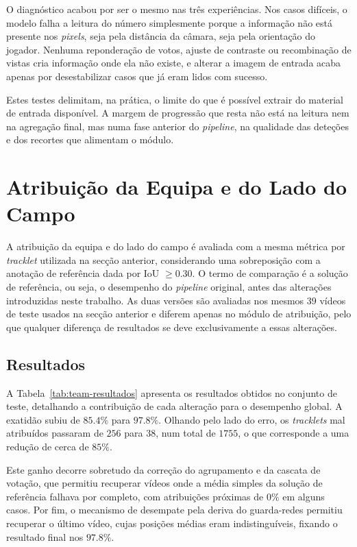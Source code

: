 O diagnóstico acabou por ser o mesmo nas três experiências. Nos casos difíceis, o modelo falha a leitura do número simplesmente porque a informação não está presente nos \emph{pixels}, seja pela distância da câmara, seja pela orientação do jogador. Nenhuma reponderação de votos, ajuste de contraste ou recombinação de vistas cria informação onde ela não existe, e alterar a imagem de entrada acaba apenas por desestabilizar casos que já eram lidos com sucesso.

Estes testes delimitam, na prática, o limite do que é possível extrair do material de entrada disponível. A margem de progressão que resta não está na leitura nem na agregação final, mas numa fase anterior do \emph{pipeline}, na qualidade das deteções e dos recortes que alimentam o módulo.

\section{Atribuição da Equipa e do Lado do Campo}

A atribuição da equipa e do lado do campo é avaliada com a mesma métrica por \emph{tracklet} utilizada na secção anterior, considerando uma sobreposição com a anotação de referência dada por IoU $\geq 0.30$. O termo de comparação é a solução de referência, ou seja, o desempenho do \emph{pipeline} original, antes das alterações introduzidas neste trabalho. As duas versões são avaliadas nos mesmos $39$ vídeos de teste usados na secção anterior e diferem apenas no módulo de atribuição, pelo que qualquer diferença de resultados se deve exclusivamente a essas alterações.

\subsection{Resultados}

A Tabela~\ref{tab:team-resultados} apresenta os resultados obtidos no conjunto de teste, detalhando a contribuição de cada alteração para o desempenho global. A exatidão subiu de $85.4\%$ para $97.8\%$. Olhando pelo lado do erro, os \emph{tracklets} mal atribuídos passaram de $256$ para $38$, num total de $1755$, o que corresponde a uma redução de cerca de $85\%$.

Este ganho decorre sobretudo da correção do agrupamento e da cascata de votação, que permitiu recuperar vídeos onde a média simples da solução de referência falhava por completo, com atribuições próximas de $0\%$ em alguns casos. Por fim, o mecanismo de desempate pela deriva do guarda-redes permitiu recuperar o último vídeo, cujas posições médias eram indistinguíveis, fixando o resultado final nos $97.8\%$.

